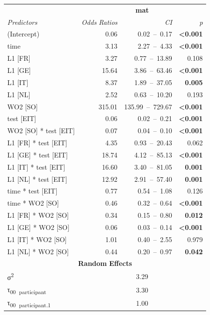 \begin{table}
    \begin{tabularx}{\textwidth}{Xrrr}
    \lsptoprule
    \textbf{~} & \multicolumn{3}{c}{ \textbf{mat}}\\
    \textit{Predictors} & \textit{Odds} \textit{Ratios} & \textit{CI} & \textit{p}\\
    \midrule
    (Intercept) & 0.06 & 0.02~–~0.17 & \textbf{<0.001}\\
    time & 3.13 & 2.27~–~4.33 & \textbf{<0.001}\\
    L1 [FR] & 3.27 & 0.77~–~13.89 & 0.108\\
    L1 [GE] & 15.64 & 3.86~–~63.46 & \textbf{<0.001}\\
    L1 [IT] & 8.37 & 1.89~–~37.05 & \textbf{0.005}\\
    L1 [NL] & 2.52 & 0.63~–~10.20 & 0.193\\
    WO2 [SO] & 315.01 & 135.99~–~729.67 & \textbf{<0.001}\\
    test [EIT] & 0.06 & 0.02~–~0.21 & \textbf{<0.001}\\
    WO2 [SO] * test [EIT] & 0.07 & 0.04~–~0.10 & \textbf{<0.001}\\
    L1 [FR] * test [EIT] & 4.35 & 0.93~–~20.43 & 0.062\\
    L1 [GE] * test [EIT] & 18.74 & 4.12~–~85.13 & \textbf{<0.001}\\
    L1 [IT] * test [EIT] & 16.60 & 3.40~–~81.05 & \textbf{0.001}\\
    L1 [NL] * test [EIT] & 12.92 & 2.91~–~57.40 & \textbf{0.001}\\
    time * test [EIT] & 0.77 & 0.54~–~1.08 & 0.126\\
    time * WO2 [SO] & 0.46 & 0.32~–~0.64 & \textbf{<0.001}\\
    L1 [FR] * WO2 [SO] & 0.34 & 0.15~–~0.80 & \textbf{0.012}\\
    L1 [GE] * WO2 [SO] & 0.06 & 0.03~–~0.14 & \textbf{<0.001}\\
    L1 [IT] * WO2 [SO] & 1.01 & 0.40~–~2.55 & 0.979\\
    L1 [NL] * WO2 [SO] & 0.44 & 0.20~–~0.97 & \textbf{0.042}\\
    \multicolumn{4}{c}{\textbf{Random} \textbf{Effects}}\\
    σ\textsuperscript{2} & \multicolumn{3}{c}{3.29}\\
    τ\textsubscript{00}~\textsubscript{participant} & \multicolumn{3}{c}{3.30}\\
    τ\textsubscript{00}~\textsubscript{participant.1} & \multicolumn{3}{c}{1.00}\\

\end{tabularx}
\end{table}
